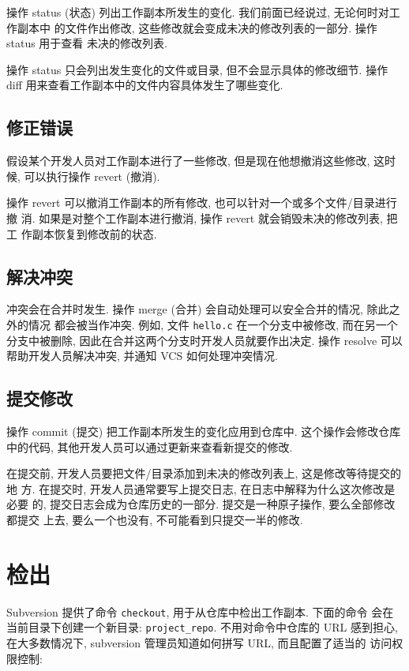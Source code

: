 \documentclass[nofonts, oneside]{ctexart}
\newcommand\svn{\texttt{svn}}
\newcommand\svnco{\texttt{checkout}}
\begin{document}
操作 status (状态) 列出工作副本所发生的变化. 我们前面已经说过, 无论何时对工作副本中
的文件作出修改, 这些修改就会变成未决的修改列表的一部分. 操作 status 用于查看
未决的修改列表.

操作 status 只会列出发生变化的文件或目录, 但不会显示具体的修改细节. 操作
diff 用来查看工作副本中的文件内容具体发生了哪些变化.

\subsection{修正错误}
\label{subsec:fix_mistakes}

假设某个开发人员对工作副本进行了一些修改, 但是现在他想撤消这些修改, 这时候,
可以执行操作 revert (撤消).

操作 revert 可以撤消工作副本的所有修改, 也可以针对一个或多个文件/目录进行撤
消. 如果是对整个工作副本进行撤消, 操作 revert 就会销毁未决的修改列表, 把工
作副本恢复到修改前的状态.

\subsection{解决冲突}

冲突会在合并时发生. 操作 merge (合并) 会自动处理可以安全合并的情况, 除此之外的情况
都会被当作冲突. 例如, 文件 \texttt{hello.c} 在一个分支中被修改, 而在另一个
分支中被删除, 因此在合并这两个分支时开发人员就要作出决定. 操作 resolve 可以
帮助开发人员解决冲突, 并通知 VCS 如何处理冲突情况.

\subsection{提交修改}
\label{subsec:commit_changes}

操作 commit (提交) 把工作副本所发生的变化应用到仓库中. 这个操作会修改仓库中的代码,
其他开发人员可以通过更新来查看新提交的修改.

在提交前, 开发人员要把文件/目录添加到未决的修改列表上, 这是修改等待提交的地
方. 在提交时, 开发人员通常要写上提交日志, 在日志中解释为什么这次修改是必要
的, 提交日志会成为仓库历史的一部分. 提交是一种原子操作, 要么全部修改都提交
上去, 要么一个也没有, 不可能看到只提交一半的修改.

\section{检出}
\label{sec:checkout_process}

Subversion 提供了命令 \texttt{checkout}, 用于从仓库中检出工作副本. 下面的命令
会在当前目录下创建一个新目录: \texttt{project\_repo}. 不用对命令中仓库的 URL
感到担心, 在大多数情况下, subversion 管理员知道如何拼写 URL, 而且配置了适当的
访问权限控制:
\end{document}
